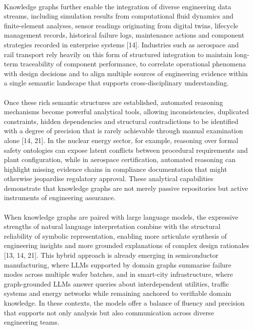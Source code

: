         \paragraph{}
        Knowledge graphs further enable the integration of diverse engineering data streams, including simulation results from computational fluid dynamics and finite-element analyses, sensor readings originating from digital twins, lifecycle management records, historical failure logs, maintenance actions and component strategies recorded in enterprise systems [14]. Industries such as aerospace and rail transport rely heavily on this form of structured integration to maintain long-term traceability of component performance, to correlate operational phenomena with design decisions and to align multiple sources of engineering evidence within a single semantic landscape that supports cross-disciplinary understanding.

        \newpage
        \paragraph{}
        Once these rich semantic structures are established, automated reasoning mechanisms become powerful analytical tools, allowing inconsistencies, duplicated constraints, hidden dependencies and structural contradictions to be identified with a degree of precision that is rarely achievable through manual examination alone [14, 21]. In the nuclear energy sector, for example, reasoning over formal safety ontologies can expose latent conflicts between procedural requirements and plant configuration, while in aerospace certification, automated reasoning can highlight missing evidence chains in compliance documentation that might otherwise jeopardise regulatory approval. These analytical capabilities demonstrate that knowledge graphs are not merely passive repositories but active instruments of engineering assurance.

        \paragraph{}
        When knowledge graphs are paired with large language models, the expressive strengths of natural language interpretation combine with the structural reliability of symbolic representation, enabling more articulate synthesis of engineering insights and more grounded explanations of complex design rationales [13, 14, 21]. This hybrid approach is already emerging in semiconductor manufacturing, where LLMs supported by domain graphs summarise failure modes across multiple wafer batches, and in smart-city infrastructure, where graph-grounded LLMs answer queries about interdependent utilities, traffic systems and energy networks while remaining anchored to verifiable domain knowledge. In these contexts, the models offer a balance of fluency and precision that supports not only analysis but also communication across diverse engineering teams.
        

